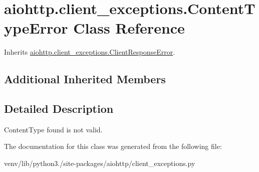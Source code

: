 \hypertarget{classaiohttp_1_1client__exceptions_1_1_content_type_error}{}\section{aiohttp.\+client\+\_\+exceptions.\+Content\+Type\+Error Class Reference}
\label{classaiohttp_1_1client__exceptions_1_1_content_type_error}


Inherits \hyperlink{classaiohttp_1_1client__exceptions_1_1_client_response_error}{aiohttp.\+client\+\_\+exceptions.\+Client\+Response\+Error}.

\subsection*{Additional Inherited Members}


\subsection{Detailed Description}
\begin{DoxyVerb}ContentType found is not valid.\end{DoxyVerb}
 

The documentation for this class was generated from the following file\+:\begin{DoxyCompactItemize}
\item 
venv/lib/python3./site-\/packages/aiohttp/client\+\_\+exceptions.\+py\end{DoxyCompactItemize}
